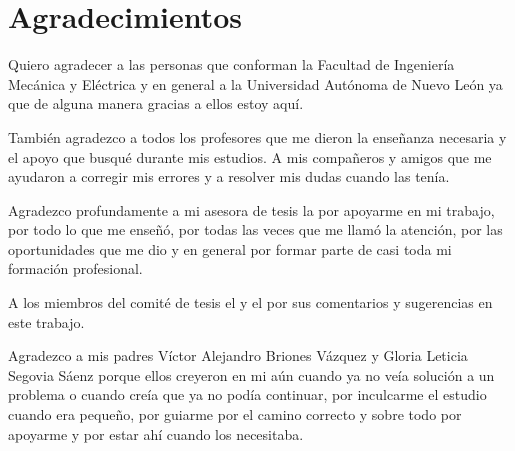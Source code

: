 \chapter*{Agradecimientos}

Quiero agradecer a las personas que conforman la Facultad de Ingenier\'ia Mec\'anica y El\'ectrica y en general a la Universidad Aut\'onoma de Nuevo Le\'on ya que de alguna manera gracias a ellos estoy aqu\'i. 

Tambi\'en agradezco a todos los profesores que me dieron la ense\~nanza necesaria y el apoyo que busqu\'e durante mis estudios. A mis compa\~neros y amigos que me ayudaron a corregir mis errores y a resolver mis dudas cuando las ten\'ia.

Agradezco profundamente a mi asesora de tesis la {\asesor} por apoyarme en mi trabajo, por todo lo que me ense\~n\'o, por todas las veces que me llam\'o la atenci\'on, por las oportunidades que me dio y en general por formar parte de casi toda mi formaci\'on profesional.

A los miembros del comit\'e de tesis el {\coasesor} y el {\revisor} por sus comentarios y sugerencias en este trabajo.

Agradezco a mis padres V\'ictor Alejandro Briones V\'azquez y Gloria Leticia Segovia S\'aenz porque ellos creyeron en mi a\'un cuando ya no ve\'ia soluci\'on a un problema o cuando cre\'ia que ya no pod\'ia continuar, por inculcarme el estudio cuando era peque\~no, por guiarme por el camino correcto y sobre todo por apoyarme y por estar ah\'i cuando los necesitaba.
\newpage

